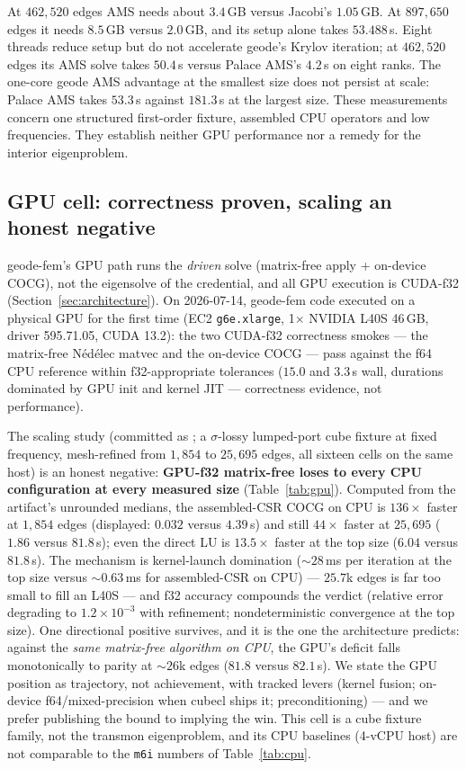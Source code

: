 \documentclass{anvil-paper}
\begin{document}
At $462{,}520$ edges AMS needs about $3.4$\,GB versus Jacobi's
$1.05$\,GB. At $897{,}650$ edges it needs $8.5$\,GB versus $2.0$\,GB,
and its setup alone takes $53.488$\,s. Eight threads reduce setup but
do not accelerate geode's Krylov iteration; at $462{,}520$ edges its
AMS solve takes $50.4$\,s versus Palace AMS's $4.2$\,s on eight ranks.
The one-core geode AMS advantage at the smallest size does not persist
at scale: Palace AMS takes $53.3$\,s against $181.3$\,s at the largest
size. These measurements concern one structured first-order fixture,
assembled CPU operators and low frequencies. They establish neither
GPU performance nor a remedy for the interior eigenproblem.

\subsection{GPU cell: correctness proven, scaling an honest negative}
\label{sec:perf-gpu}

geode-fem's GPU path runs the \emph{driven} solve (matrix-free
apply + on-device COCG), not the eigensolve of the credential, and all
GPU execution is CUDA-f32 (Section~\ref{sec:architecture}). On
2026-07-14, geode-fem code executed on a physical GPU for the first time
(EC2 \texttt{g6e.xlarge}, 1$\times$ NVIDIA L40S 46\,GB, driver
595.71.05, CUDA 13.2): the two CUDA-f32 correctness smokes --- the
matrix-free N\'ed\'elec matvec and the on-device COCG --- pass against
the f64 CPU reference within f32-appropriate tolerances ($15.0$ and
$3.3$\,s wall, durations dominated by GPU init and kernel JIT ---
correctness evidence, not performance).

The scaling study (committed as
; a $\sigma$-lossy
lumped-port cube fixture at fixed frequency, mesh-refined from $1{,}854$
to $25{,}695$ edges, all sixteen cells on the same host) is an honest
negative: \textbf{GPU-f32 matrix-free loses to every CPU configuration
at every measured size} (Table~\ref{tab:gpu}). Computed from the
artifact's unrounded medians, the assembled-CSR COCG on CPU is
$136\times$ faster at $1{,}854$ edges (displayed: $0.032$ versus
$4.39$\,s) and still $44\times$
faster at $25{,}695$ ($1.86$ versus $81.8$\,s); even the direct LU is
$13.5\times$ faster at the top size ($6.04$ versus $81.8$\,s). The
mechanism is kernel-launch domination (${\sim}28$\,ms per iteration at
the top size versus ${\sim}0.63$\,ms for assembled-CSR on CPU) ---
$25.7$k edges is far too small to fill an L40S --- and f32 accuracy
compounds the verdict (relative error degrading to $1.2\times10^{-3}$
with refinement; nondeterministic convergence at the top size). One
directional positive survives, and it is the one the architecture
predicts: against the \emph{same matrix-free algorithm on CPU}, the
GPU's deficit falls monotonically to parity at ${\sim}26$k edges
($81.8$ versus $82.1$\,s). We state the GPU position as trajectory, not
achievement, with tracked levers (kernel fusion; on-device
f64/mixed-precision when cubecl ships it; preconditioning) --- and we
prefer publishing the bound to implying the win. This cell is a cube
fixture family, not the transmon eigenproblem, and its CPU baselines
(4-vCPU host) are not comparable to the \texttt{m6i} numbers of
Table~\ref{tab:cpu}.
\end{document}
